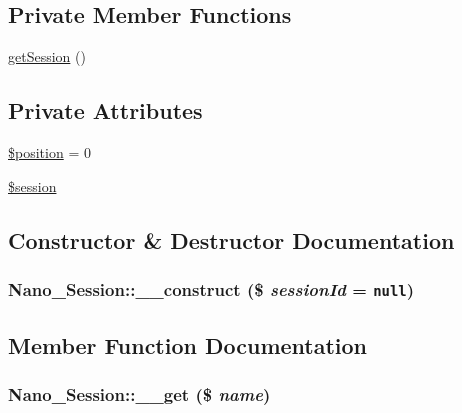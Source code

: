 \subsection*{Private Member Functions}
\begin{CompactItemize}
\item 
\hyperlink{classNano__Session_9d81f746b3297afa96c6502f81a219a3}{getSession} ()
\end{CompactItemize}
\subsection*{Private Attributes}
\begin{CompactItemize}
\item 
\hyperlink{classNano__Session_3a4e100cedefa4e473e8adce6cf9a914}{\$position} = 0
\item 
\hyperlink{classNano__Session_18f5c411ce061ae44379b191b832dd39}{\$session}
\end{CompactItemize}


\subsection{Constructor \& Destructor Documentation}
\hypertarget{classNano__Session_6afd4ba7d8417c936bbb8be40e51cd91}{
\subsubsection[{\_\-\_\-construct}]{\setlength{\rightskip}{0pt plus 5cm}Nano\_\-Session::\_\-\_\-construct (\$ {\em sessionId} = {\tt null})}}
\label{classNano__Session_6afd4ba7d8417c936bbb8be40e51cd91}




\subsection{Member Function Documentation}
\hypertarget{classNano__Session_8c06d63a2eb1a50715cde24f533d08e1}{
\subsubsection[{\_\-\_\-get}]{\setlength{\rightskip}{0pt plus 5cm}Nano\_\-Session::\_\-\_\-get (\$ {\em name})}}
\label{classNano__Session_8c06d63a2eb1a50715cde24f533d08e1}


